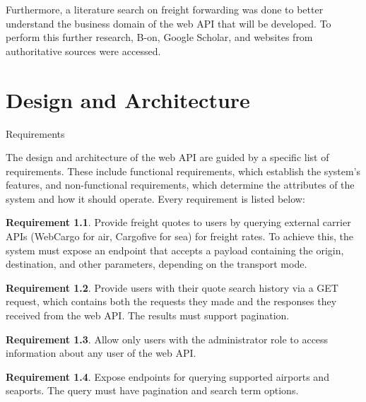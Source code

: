 \documentclass[12pt, reqno, oneside]{amsbook}
\makeatletter
\def\section{\@startsection{section}{1}%
      \z@{.5\linespacing\@plus.7\linespacing}{.25\linespacing}%
      {\normalfont\bfseries\flushleft}}
\theoremstyle{definition}
\theoremstyle{definition}
\newtheorem{requirement}{Requirement}
\numberwithin{section}{chapter}
\numberwithin{table}{chapter}
\numberwithin{figure}{chapter}
\makeatother
\begin{document}
Furthermore, a literature search on freight forwarding was done to better understand the business domain of the web API that will be developed. To perform this further research, B-on, Google Scholar, and websites from authoritative sources were accessed.

\chapter{Design and Architecture}
\label{Chapter:Design_And_Architecture}

\section{Requirements}
\label{Section:Requirements}

The design and architecture of the web \ac{API} are guided by a specific list of requirements. These include functional requirements, which establish the system's features, and non-functional requirements, which determine the attributes of the system and how it should operate. Every requirement is listed below:

\begin{requirement}
  \label{Requirement:1}
  Provide freight quotes to users by querying external carrier \acp{API} (WebCargo for air, Cargofive for sea) for freight rates. To achieve this, the system must expose an endpoint that accepts a payload containing the origin, destination, and other parameters, depending on the transport mode.
\end{requirement}

\begin{requirement}
  \label{Requirement:2}
  Provide users with their quote search history via a GET request, which contains both the requests they made and the responses they received from the web \ac{API}. The results must support pagination.
\end{requirement}

\begin{requirement}
  \label{Requirement:3}
  Allow only users with the administrator role to access information about any user of the web \ac{API}.
\end{requirement}

\begin{requirement}
  \label{Requirement:4}
  Expose endpoints for querying supported airports and seaports. The query must have pagination and search term options.
\end{requirement}
\end{document}
